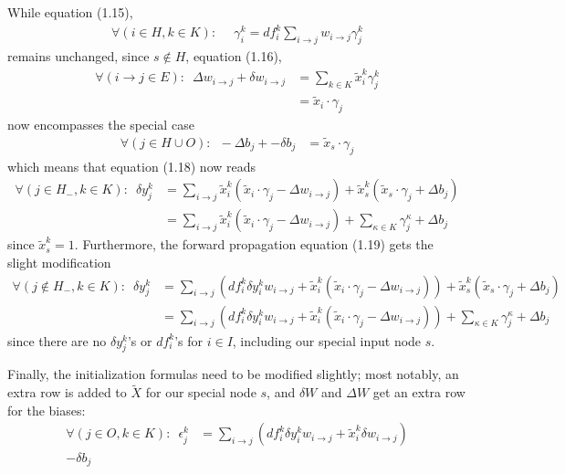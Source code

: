\documentclass[12pt]{article}
\renewcommand{\ij}{i \rightarrow j}
\begin{document}
While equation (1.15),
\begin{align}
\forall (i \in H, k \in K): & \,\,\, \gamma_i^k = df_i^k \sum_{i \rightarrow j} w_{i \rightarrow j} \gamma_j^k
\end{align}
remains unchanged, since $s \not\in H$, equation (1.16),
\begin{align}
\forall (\ij \in E): \,\,\, \Delta w_{\ij} + \delta w_{\ij}
& = \sum_{k \in K} \tilde{x}_i^k \gamma_{j}^k \\
& = \tilde{x}_i \cdot \gamma_j
\end{align}
now encompasses the special case
\begin{align}
\forall (j \in H \cup O): \,\,\, -\Delta b_j + -\delta b_j 
& = \tilde{x}_s \cdot \gamma_j
\end{align}
which means that equation (1.18) now reads
\begin{align}
\forall (j \in H_-, k \in K): \,\,\, \delta y_j^k
& = \sum_{\ij} \tilde{x}_i^k (\tilde{x}_i \cdot \gamma_j - \Delta w_{\ij})
+ \tilde{x}_s^k (\tilde{x}_s \cdot \gamma_j + \Delta b_j) \\
& = \sum_{\ij} \tilde{x}_i^k (\tilde{x}_i \cdot \gamma_j - \Delta w_{\ij})
+ \sum_{\kappa \in K} \gamma_j^\kappa + \Delta b_j
\end{align}
since $\tilde{x}_s^k = 1$.
Furthermore, the forward propagation equation (1.19) gets the slight modification
\begin{align}
\forall (j \not\in H_-, k \in K): \,\,\, \delta y_j^k & = 
\sum_{\ij} (df_i^k \delta y_i^k w_{\ij} + \tilde{x}_i^k (\tilde{x}_i \cdot \gamma_j - \Delta w_{\ij}) ) 
+ \tilde{x}_s^k (\tilde{x}_s \cdot \gamma_j + \Delta b_j) \\
& = \sum_{\ij} (df_i^k \delta y_i^k w_{\ij} + \tilde{x}_i^k (\tilde{x}_i \cdot \gamma_j - \Delta w_{\ij}) ) 
+ \sum_{\kappa \in K} \gamma_j^\kappa + \Delta b_j
\end{align}
since there are no $\delta y_j^k$'s or $df_i^k$'s for $i \in I$, including our special input node $s$.

Finally, the initialization formulas need to be modified slightly;
most notably, an extra row is added to $\tilde{X}$ for our special node $s$,
and $\delta W$ and $\Delta W$ get an extra row for the biases:
\begin{align}
\forall (j \in O, k \in K): \,\,\, \epsilon_j^k & = 
\sum_{\ij} (df_i^k \delta y_i^k w_{\ij} + \tilde{x}_i^k \delta w_{\ij}) \\
- \delta b_j
\end{align}



{}

\end{document}
